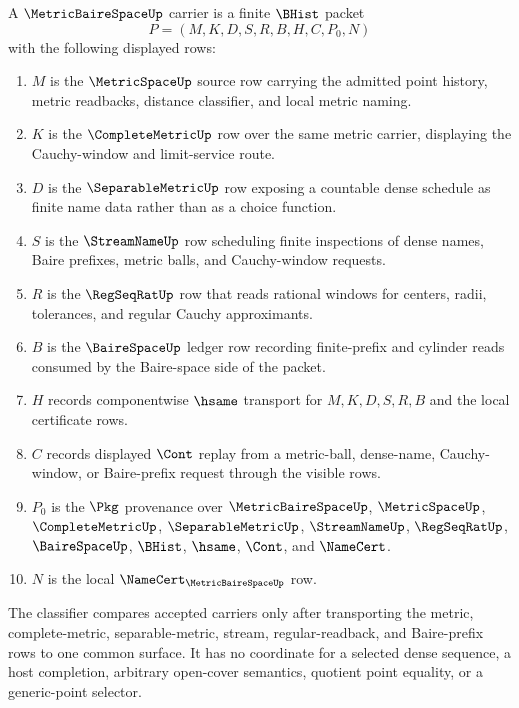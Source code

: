 \begin{definition}
\label{def:metric-baire-space-carrier}
A $\MetricBaireSpaceUp$ carrier is a finite $\BHist$ packet
$$
P=(M,K,D,S,R,B,H,C,P_0,N)
$$
with the following displayed rows:
\begin{enumerate}
\item $M$ is the $\MetricSpaceUp$ source row carrying the admitted point
history, metric readbacks, distance classifier, and local metric naming.
\item $K$ is the $\CompleteMetricUp$ row over the same metric carrier,
displaying the Cauchy-window and limit-service route.
\item $D$ is the $\SeparableMetricUp$ row exposing a countable dense schedule
as finite name data rather than as a choice function.
\item $S$ is the $\StreamNameUp$ row scheduling finite inspections of dense
names, Baire prefixes, metric balls, and Cauchy-window requests.
\item $R$ is the $\RegSeqRatUp$ row that reads rational windows for centers,
radii, tolerances, and regular Cauchy approximants.
\item $B$ is the $\BaireSpaceUp$ ledger row recording finite-prefix and
cylinder reads consumed by the Baire-space side of the packet.
\item $H$ records componentwise $\hsame$ transport for $M,K,D,S,R,B$ and the
local certificate rows.
\item $C$ records displayed $\Cont$ replay from a metric-ball, dense-name,
Cauchy-window, or Baire-prefix request through the visible rows.
\item $P_0$ is the $\Pkg$ provenance over $\MetricBaireSpaceUp$,
$\MetricSpaceUp$, $\CompleteMetricUp$, $\SeparableMetricUp$, $\StreamNameUp$,
$\RegSeqRatUp$, $\BaireSpaceUp$, $\BHist$, $\hsame$, $\Cont$, and $\NameCert$.
\item $N$ is the local $\NameCert_{\MetricBaireSpaceUp}$ row.
\end{enumerate}
The classifier compares accepted carriers only after transporting the metric,
complete-metric, separable-metric, stream, regular-readback, and Baire-prefix
rows to one common surface. It has no coordinate for a selected dense
sequence, a host completion, arbitrary open-cover semantics, quotient point
equality, or a generic-point selector.
\end{definition}

